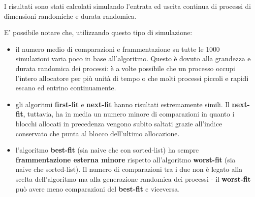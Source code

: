 \documentclass[12pt]{report}
\renewcommand\emph{\textbf}
\begin{document}
            I risultati sono stati calcolati simulando l'entrata ed uscita continua di processi di dimensioni randomiche e durata randomica.

            E' possibile notare che, utilizzando questo tipo di simulazione:

            \begin{itemize}
                \item il numero medio di comparazioni e frammentazione su tutte le 1000 simulazioni varia poco in base all'algoritmo. Questo è dovuto alla grandezza e durata randomica dei processi: è a volte possibile che un processo occupi l'intero allocatore per più unità di tempo o che molti processi piccoli e rapidi escano ed entrino continuamente.
                \item gli algoritmi \emph{first-fit} e \emph{next-fit} hanno risultati estremamente simili. Il \emph{next-fit}, tuttavia, ha in media un numero minore di comparazioni in quanto i blocchi allocati in precedenza vengono subito saltati grazie all'indice conservato che punta al blocco dell'ultimo allocazione.
                \item l'algoritmo \emph{best-fit} (sia naive che con sorted-list) ha sempre \emph{frammentazione esterna minore} rispetto all'algoritmo \emph{worst-fit} (sia naive che sorted-list). Il numero di comparazioni tra i due non è legato alla scelta dell'algoritmo ma alla generazione randomica dei processi - il \emph{worst-fit} può avere meno comparazioni del \emph{best-fit} e viceversa.
            \end{itemize}
\end{document}
